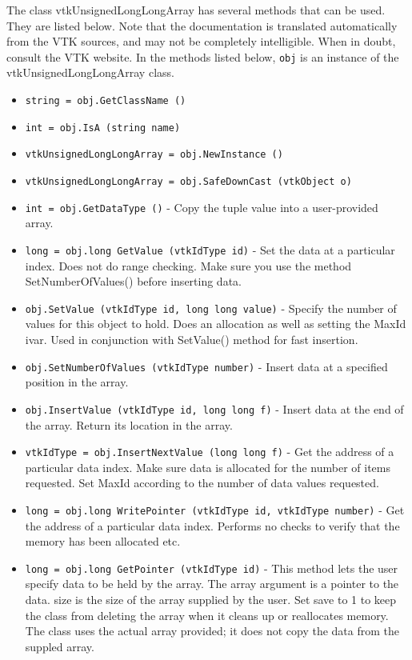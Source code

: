 The class vtkUnsignedLongLongArray has several methods that can be used.
  They are listed below.
Note that the documentation is translated automatically from the VTK sources,
and may not be completely intelligible.  When in doubt, consult the VTK website.
In the methods listed below, \verb|obj| is an instance of the vtkUnsignedLongLongArray class.
\begin{itemize}
\item  \verb|string = obj.GetClassName ()|

\item  \verb|int = obj.IsA (string name)|

\item  \verb|vtkUnsignedLongLongArray = obj.NewInstance ()|

\item  \verb|vtkUnsignedLongLongArray = obj.SafeDownCast (vtkObject o)|

\item  \verb|int = obj.GetDataType ()| -  Copy the tuple value into a user-provided array.

\item  \verb|long = obj.long GetValue (vtkIdType id)| -  Set the data at a particular index. Does not do range checking. Make sure
 you use the method SetNumberOfValues() before inserting data.

\item  \verb|obj.SetValue (vtkIdType id, long long value)| -  Specify the number of values for this object to hold. Does an
 allocation as well as setting the MaxId ivar. Used in conjunction with
 SetValue() method for fast insertion.

\item  \verb|obj.SetNumberOfValues (vtkIdType number)| -  Insert data at a specified position in the array.

\item  \verb|obj.InsertValue (vtkIdType id, long long f)| -  Insert data at the end of the array. Return its location in the array.

\item  \verb|vtkIdType = obj.InsertNextValue (long long f)| -  Get the address of a particular data index. Make sure data is allocated
 for the number of items requested. Set MaxId according to the number of
 data values requested.

\item  \verb|long = obj.long WritePointer (vtkIdType id, vtkIdType number)| -  Get the address of a particular data index. Performs no checks
 to verify that the memory has been allocated etc.

\item  \verb|long = obj.long GetPointer (vtkIdType id)| -  This method lets the user specify data to be held by the array.  The
 array argument is a pointer to the data.  size is the size of
 the array supplied by the user.  Set save to 1 to keep the class
 from deleting the array when it cleans up or reallocates memory.
 The class uses the actual array provided; it does not copy the data
 from the suppled array. 

\end{itemize}
